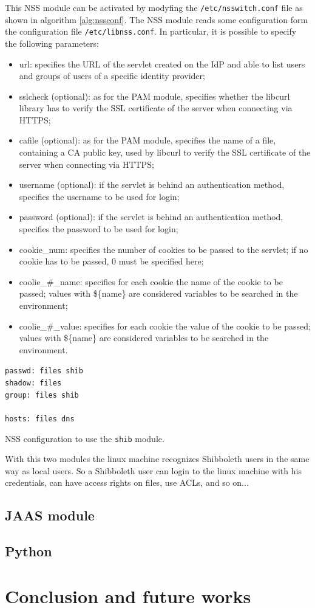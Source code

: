 This NSS module can be activated by modyfing the \texttt{/etc/nsswitch.conf} file as shown in algorithm \ref{alg:nssconf}.
The NSS module reads some configuration form the configuration file \texttt{/etc/libnss.conf}.
In particular, it is possible to specify the following parameters:
\begin{itemize}
\item url: specifies the URL of the servlet created on the IdP and able to list users and groups of users of a specific identity provider;
\item sslcheck (optional): as for the PAM module, specifies whether the libcurl library has to verify the SSL certificate of the server when
connecting via HTTPS;
\item cafile (optional): as for the PAM module, specifies the name of a file, containing a CA public key, used by libcurl to verify the SSL
certificate of the server when connecting via HTTPS;
\item username (optional): if the servlet is behind an authentication method, specifies the username to be used for login;
\item password (optional): if the servlet is behind an authentication method, specifies the password to be used for login;
\item cookie\_num: specifies the number of cookies to be passed to the servlet; if no cookie has to be passed, 0 must be specified here;
\item coolie\_\#\_name: specifies for each cookie the name of the cookie to be passed; values with \$\{name\} are considered variables to
be searched in the environment;
\item coolie\_\#\_value: specifies for each cookie the value of the cookie to be passed; values with \$\{name\} are considered variables to
be searched in the environment.
\end{itemize}

\begin{algorithm}[t]
\SetAlgoNoLine
\texttt{passwd:     files shib}\\
\texttt{shadow:     files}\\
\texttt{group:      files shib}\\
\texttt{}\\
\texttt{hosts:      files dns}
\caption{NSS configuration to use the \texttt{shib} module.}
\label{alg:nssconf}
\end{algorithm}

With this two modules the linux machine recognizes Shibboleth users in the same way as local users.
So a Shibboleth user can login to the linux machine with his credentials, can have access rights on files, use ACLs, and so on...

\label{sec:jaas}
\subsection{JAAS module}

\label{sec:python}
\subsection{Python}

\label{sec:conclusion}
\section{Conclusion and future works}

